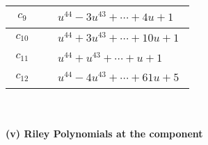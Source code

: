 \documentclass[1p]{elsarticle_modified}
\theoremstyle{definition}
\begin{document}
\begin{tabular}{m{50pt}|m{274pt}}
\hline $$\begin{aligned}c_{9}\end{aligned}$$&$\begin{aligned}
&u^{44}-3 u^{43}+\cdots+4 u+1
\end{aligned}$\\
\hline $$\begin{aligned}c_{10}\end{aligned}$$&$\begin{aligned}
&u^{44}+3 u^{43}+\cdots+10 u+1
\end{aligned}$\\
\hline $$\begin{aligned}c_{11}\end{aligned}$$&$\begin{aligned}
&u^{44}+u^{43}+\cdots+u+1
\end{aligned}$\\
\hline $$\begin{aligned}c_{12}\end{aligned}$$&$\begin{aligned}
&u^{44}-4 u^{43}+\cdots+61 u+5
\end{aligned}$\\
\hline
\end{tabular}\\~\\
\newpage\renewcommand{\arraystretch}{1}
\flushleft \textbf{(v) Riley Polynomials at the component}\newline \\
\end{document}
